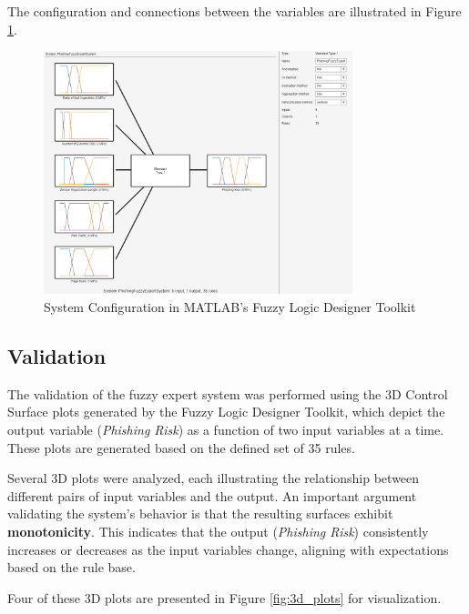 \documentclass{article}
\begin{document}
The configuration and connections between the variables are illustrated in Figure \ref{fig:system_configuration}.
\begin{figure}[H]
    \centering
    \includegraphics[width=0.8\textwidth]{figures/SystemConfiguration.png}
    \caption{System Configuration in MATLAB's Fuzzy Logic Designer Toolkit}
    \label{fig:system_configuration}
\end{figure}

\subsection{Validation}


The validation of the fuzzy expert system was performed using the 3D Control Surface plots generated by the Fuzzy Logic Designer Toolkit, which depict the output variable (\textit{Phishing Risk}) as a function of two input variables at a time. These plots are generated based on the defined set of 35 rules.

Several 3D plots were analyzed, each illustrating the relationship between different pairs of input variables and the output. An important argument validating the system's behavior is that the resulting surfaces exhibit \textbf{monotonicity}. This indicates that the output (\textit{Phishing Risk}) consistently increases or decreases as the input variables change, aligning with expectations based on the rule base.

Four of these 3D plots are presented in Figure \ref{fig:3d_plots} for visualization.  
\end{document}
